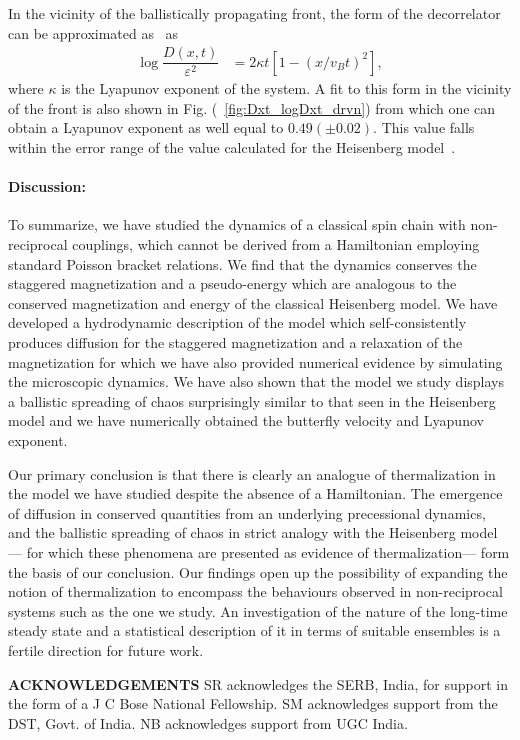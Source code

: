 \documentclass[prl,aps,twocolumn,nosuperscriptaddress,bibnotes,notitlepage,nofootinbib]{revtex4-2}
\begin{document}
In the vicinity of the ballistically propagating front, the form of the decorrelator can be approximated as~\cite{das2018light} as
\begin{align}
\log%
\dfrac{D(x,t)}{\varepsilon^2 } &= 2 \kappa t [1 - (x/v_B t)^2],
\label{eqn:front}
\end{align}
where $\kappa$ is the Lyapunov exponent of the system. A fit to this form in the vicinity of the front is also shown in Fig. (~\ref{fig:Dxt_logDxt_drvn}) from which one can obtain a Lyapunov exponent as well equal to $0.49(\pm 0.02)$. This value falls within the error range of the value calculated for the Heisenberg model~\cite{das2018light,Suppinf}.


\paragraph{Discussion:} To summarize, we have studied the dynamics of a classical spin chain with non-reciprocal couplings, which cannot be derived from a Hamiltonian employing standard Poisson bracket relations. We find that the dynamics conserves the staggered magnetization and a pseudo-energy which are analogous to the conserved magnetization and energy of the classical Heisenberg model. We have developed a hydrodynamic description of the model which self-consistently produces diffusion for the staggered magnetization and a relaxation of the magnetization for which we have also provided numerical evidence by simulating the microscopic dynamics. We have also shown that the model we study displays a ballistic spreading of chaos 
surprisingly similar to that seen in the Heisenberg model and we have numerically obtained the butterfly velocity and Lyapunov exponent. 

Our primary conclusion is that there is clearly an analogue of thermalization in the model we have studied despite the absence of a Hamiltonian. The emergence %
of diffusion in conserved quantities from an underlying precessional dynamics, and the ballistic spreading of chaos in strict analogy with the Heisenberg model --- for which these phenomena are presented as evidence of thermalization--- 
form the basis of our conclusion. 
Our findings open up the possibility of expanding the notion of thermalization 
to encompass the  behaviours observed in non-reciprocal systems such as the one we study. An investigation of the nature of the long-time steady state and a statistical description of it in terms of suitable ensembles is a fertile direction for future work.

\textbf{ACKNOWLEDGEMENTS} SR acknowledges the SERB, India, for support in the form of a J C Bose National Fellowship. SM acknowledges support from the DST, Govt. of India. NB acknowledges support from UGC India.

\end{document}
